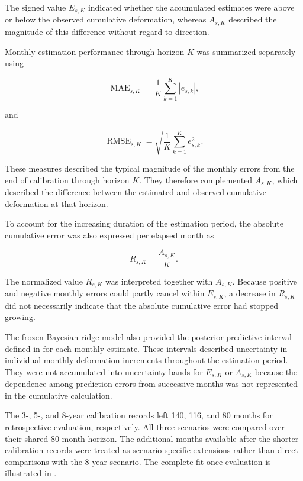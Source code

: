 The signed value $E_{s,K}$ indicated whether the accumulated estimates were above or below the observed cumulative deformation, whereas $A_{s,K}$ described the magnitude of this difference without regard to direction.

Monthly estimation performance through horizon $K$ was summarized separately using

\begin{equation}
\operatorname{MAE}_{s,K}
=
\frac{1}{K}
\sum_{k=1}^{K}
\left|e_{s,k}\right|,
\label{eq:stoppage_running_mae}
\end{equation}

and

\begin{equation}
\operatorname{RMSE}_{s,K}
=
\sqrt{
\frac{1}{K}
\sum_{k=1}^{K}
e_{s,k}^{2}
}.
\label{eq:stoppage_running_rmse}
\end{equation}

These measures described the typical magnitude of the monthly errors from the end of calibration through horizon $K$. They therefore complemented $A_{s,K}$, which described the difference between the estimated and observed cumulative deformation at that horizon.

To account for the increasing duration of the estimation period, the absolute cumulative error was also expressed per elapsed month as

\begin{equation}
R_{s,K}
=
\frac{A_{s,K}}{K}.
\label{eq:stoppage_horizon_normalized_error}
\end{equation}

The normalized value $R_{s,K}$ was interpreted together with $A_{s,K}$. Because positive and negative monthly errors could partly cancel within $E_{s,K}$, a decrease in $R_{s,K}$ did not necessarily indicate that the absolute cumulative error had stopped growing.

The frozen Bayesian ridge model also provided the posterior predictive interval defined in  for each monthly estimate. These intervals described uncertainty in individual monthly deformation increments throughout the estimation period. They were not accumulated into uncertainty bands for $E_{s,K}$ or $A_{s,K}$ because the dependence among prediction errors from successive months was not represented in the cumulative calculation.

The 3-, 5-, and 8-year calibration records left 140, 116, and 80 months for retrospective evaluation, respectively. All three scenarios were compared over their shared 80-month horizon. The additional months available after the shorter calibration records were treated as scenario-specific extensions rather than direct comparisons with the 8-year scenario. The complete fit-once evaluation is illustrated in .

